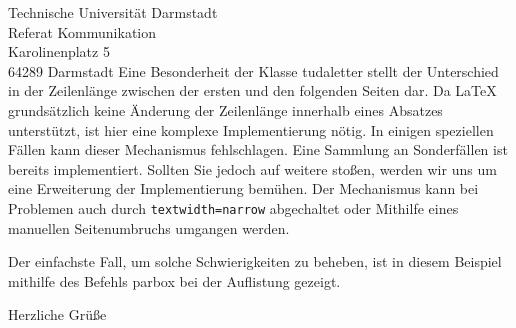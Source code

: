 \documentclass[
	german,
	accentcolor=9c,%
	premium=true,%
]{tudaletter}
\begin{document}
\begin{letter}{%
		Technische Universität Darmstadt\\%
		Referat Kommunikation\\%
		Karolinenplatz 5\\%
		64289 Darmstadt}
	Eine Besonderheit der Klasse tudaletter stellt der Unterschied in der Zeilenlänge zwischen der ersten und den folgenden Seiten dar. Da \LaTeX{} grundsätzlich keine Änderung der Zeilenlänge innerhalb eines Absatzes unterstützt, ist hier eine komplexe Implementierung nötig. In einigen speziellen Fällen kann dieser Mechanismus fehlschlagen. Eine Sammlung an Sonderfällen ist bereits implementiert. Sollten Sie jedoch auf weitere stoßen, werden wir uns um eine Erweiterung der Implementierung bemühen. Der Mechanismus kann bei Problemen auch durch \verb+textwidth=narrow+ abgechaltet oder Mithilfe eines manuellen Seitenumbruchs umgangen werden.

	Der einfachste Fall, um solche Schwierigkeiten zu beheben, ist in diesem Beispiel mithilfe des Befehls parbox bei der Auflistung gezeigt.

	\closing{Herzliche Grüße}


\end{letter}
\end{document}
